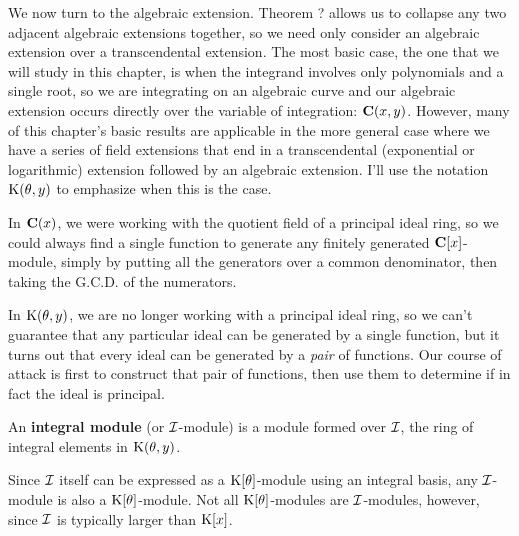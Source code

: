 
\setcounter{chapter}{8}

We now turn to the algebraic extension.  Theorem ? allows us to
collapse any two adjacent algebraic extensions together, so we need
only consider an algebraic extension over a transcendental extension.
The most basic case, the one that we will study in this chapter, is
when the integrand involves only polynomials and a single root, so we
are integrating on an algebraic curve and our algebraic extension
occurs directly over the variable of integration: ${\bf C}(x,y)$.
However, many of this chapter's basic results are applicable in the
more general case where we have a series of field extensions that end
in a transcendental (exponential or logarithmic) extension followed by
an algebraic extension.  I'll use the notation ${\rm K}(\theta, y)$ to
emphasize when this is the case.




{}

In ${\bf C}(x)$, we were working with the quotient field of a
principal ideal ring, so we could always find a single function to
generate any finitely generated ${\bf C}[x]$-module, simply by putting
all the generators over a common denominator, then taking the
G.C.D. of the numerators.

In ${\rm K}(\theta,y)$, we are no longer working with a principal ideal
ring, so we can't guarantee that any particular ideal can be generated
by a single function, but it turns out that every ideal can be
generated by a {\it pair} of functions.  Our course of attack is first
to construct that pair of functions, then use them to determine if in
fact the ideal is principal.


An {\bf integral module} (or ${\cal I}$-module) is a module formed
over ${\cal I}$, the ring of integral elements in ${\rm K}(\theta,y)$.

\enddefinition

Since ${\cal I}$ itself can be expressed as a ${\rm K}[\theta]$-module
using an integral basis, any ${\cal I}$-module is also a ${\rm
K}[\theta]$-module.  Not all ${\rm K}[\theta]$-modules are ${\cal
I}$-modules, however, since ${\cal I}$ is typically larger than ${\rm
K}[x]$.


